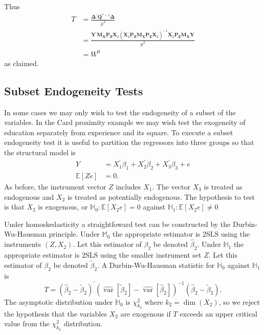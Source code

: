 \documentclass[10pt]{article}
\begin{document}
Thus
$$
\begin{aligned}
T &=\frac{\boldsymbol{\Delta}^{\prime} \boldsymbol{Q}^{*-1} \boldsymbol{\Delta}}{\widehat{\sigma}^{2}} \\
&=\frac{\boldsymbol{Y}^{\prime} \boldsymbol{M}_{\boldsymbol{X}} \boldsymbol{P}_{\boldsymbol{Z}} \boldsymbol{X}_{2}\left(\boldsymbol{X}_{2}^{\prime} \boldsymbol{P}_{\boldsymbol{Z}} \boldsymbol{M}_{\boldsymbol{X}} \boldsymbol{P}_{\boldsymbol{Z}} \boldsymbol{X}_{2}\right)^{-1} \boldsymbol{X}_{2}^{\prime} \boldsymbol{P}_{\boldsymbol{Z}} \boldsymbol{M}_{\boldsymbol{X}} \boldsymbol{Y}}{\widehat{\sigma}^{2}} \\
&=W^{0}
\end{aligned}
$$
as claimed.

\subsection{Subset Endogeneity Tests}
In some cases we may only wish to test the endogeneity of a subset of the variables. In the Card proximity example we may wish test the exogeneity of education separately from experience and its square. To execute a subset endogeneity test it is useful to partition the regressors into three groups so that the structural model is
$$
\begin{aligned}
Y &=X_{1}^{\prime} \beta_{1}+X_{2}^{\prime} \beta_{2}+X_{3}^{\prime} \beta_{3}+e \\
\mathbb{E}[Z e] &=0 .
\end{aligned}
$$
As before, the instrument vector $Z$ includes $X_{1}$. The vector $X_{3}$ is treated as endogenous and $X_{2}$ is treated as potentially endogenous. The hypothesis to test is that $X_{2}$ is exogenous, or $\mathbb{H}_{0}: \mathbb{E}\left[X_{2} e\right]=0$ against $\mathbb{H}_{1}: \mathbb{E}\left[X_{2} e\right] \neq 0$

Under homoskedasticity a straightfoward test can be constructed by the Durbin-Wu-Hausman principle. Under $\mathbb{M}_{0}$ the appropriate estimator is $2 \mathrm{SLS}$ using the instruments $\left(Z, X_{2}\right)$. Let this estimator of $\beta_{2}$ be denoted $\widehat{\beta}_{2}$. Under $\mathbb{H}_{1}$ the appropriate estimator is 2SLS using the smaller instrument set $Z$. Let this estimator of $\beta_{2}$ be denoted $\widetilde{\beta}_{2}$. A Durbin-Wu-Hausman statistic for $\mathbb{H}_{0}$ against $\mathbb{H}_{1}$ is
$$
T=\left(\widehat{\beta}_{2}-\widetilde{\beta}_{2}\right)^{\prime}\left(\widehat{\operatorname{var}}\left[\widetilde{\beta}_{2}\right]-\widehat{\operatorname{var}}\left[\widehat{\beta}_{2}\right]\right)^{-1}\left(\widehat{\beta}_{2}-\widetilde{\beta}_{2}\right) .
$$
The asymptotic distribution under $\mathbb{H}_{0}$ is $\chi_{k_{2}}^{2}$ where $k_{2}=\operatorname{dim}\left(X_{2}\right)$, so we reject the hypothesis that the variables $X_{2}$ are exogenous if $T$ exceeds an upper critical value from the $\chi_{k_{2}}^{2}$ distribution.
\end{document}

